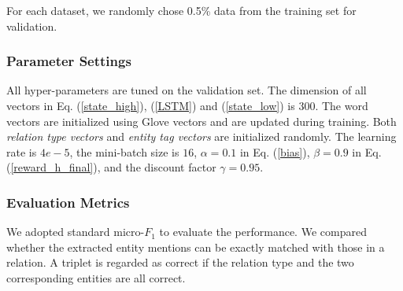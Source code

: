 \documentclass[letterpaper]{article}
\theoremstyle{definition}
\begin{document}
For each dataset, we randomly chose 0.5\% data from the training set for validation.

\subsubsection{Parameter Settings}
All hyper-parameters are tuned on the validation set. The dimension of all vectors in Eq. (\ref{state_high}), (\ref{LSTM}) and (\ref{state_low}) is $300$. The word vectors are initialized using Glove vectors \cite{pennington2014glove} and are updated during training. Both \textit{relation type vectors} and \textit{entity tag vectors} are initialized randomly. %
The learning rate is $4e-5$, the mini-batch size is $16$, $\alpha = 0.1$ in Eq. (\ref{bias}), $\beta = 0.9$ in Eq. (\ref{reward_h_final}), and the discount factor $\gamma = 0.95$.

\subsubsection{Evaluation Metrics}
We adopted standard micro-$F_1$ to evaluate the performance. We compared whether the extracted entity mentions can be exactly matched with those in a relation.
A triplet is regarded as correct if the relation type and the two corresponding entities are all correct.
\end{document}
